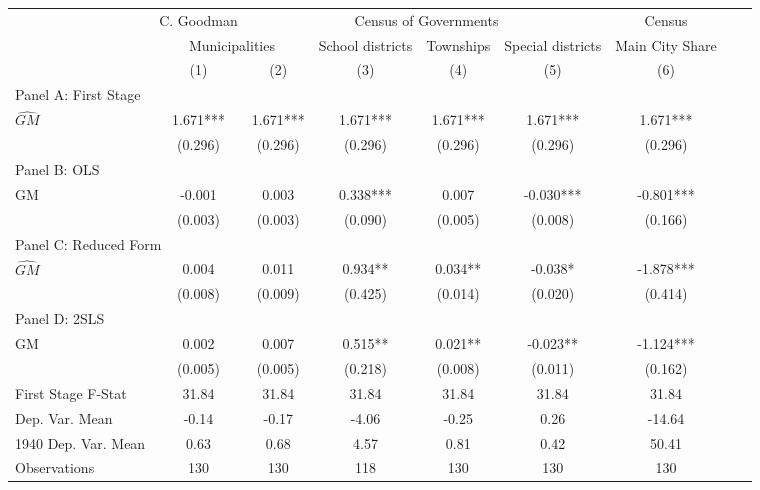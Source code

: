  \begin{tabular}{l*{8}{c}} \toprule
&\multicolumn{1}{c}{C. Goodman}&\multicolumn{4}{c}{Census of Governments}&\multicolumn{1}{c}{Census}\\\cmidrule(lr){2-2}\cmidrule(lr){3-6}\cmidrule(lr){7-7}
&\multicolumn{2}{c}{Municipalities}&\multicolumn{1}{c}{School districts}&\multicolumn{1}{c}{Townships}&\multicolumn{1}{c}{Special districts}&\multicolumn{1}{c}{Main City Share}\\\cmidrule(lr){2-3}\cmidrule(lr){4-6}\cmidrule(lr){7-7}
&\multicolumn{1}{c}{(1)}&\multicolumn{1}{c}{(2)}&\multicolumn{1}{c}{(3)}&\multicolumn{1}{c}{(4)}&\multicolumn{1}{c}{(5)}&\multicolumn{1}{c}{(6)}\\
\cmidrule(lr){1-7}
\multicolumn{6}{l}{Panel A: First Stage}\\
\cmidrule(lr){1-7}
$\widehat{GM}$  &    1.671***&    1.671***&    1.671***&    1.671***&    1.671***&    1.671***\\
                &  (0.296)   &  (0.296)   &  (0.296)   &  (0.296)   &  (0.296)   &  (0.296)   \\
\cmidrule(lr){1-7}
\multicolumn{6}{l}{Panel B: OLS}\\
\cmidrule(lr){1-7}
GM              &   -0.001   &    0.003   &    0.338***&    0.007   &   -0.030***&   -0.801***\\
                &  (0.003)   &  (0.003)   &  (0.090)   &  (0.005)   &  (0.008)   &  (0.166)   \\
\cmidrule(lr){1-7}
\multicolumn{6}{l}{Panel C: Reduced Form}\\
\cmidrule(lr){1-7}
$\widehat{GM}$  &    0.004   &    0.011   &    0.934** &    0.034** &   -0.038*  &   -1.878***\\
                &  (0.008)   &  (0.009)   &  (0.425)   &  (0.014)   &  (0.020)   &  (0.414)   \\
\cmidrule(lr){1-7}
\multicolumn{6}{l}{Panel D: 2SLS}\\
\cmidrule(lr){1-7}
GM              &    0.002   &    0.007   &    0.515** &    0.021** &   -0.023** &   -1.124***\\
                &  (0.005)   &  (0.005)   &  (0.218)   &  (0.008)   &  (0.011)   &  (0.162)   \\
\midrule
First Stage F-Stat&    31.84   &    31.84   &    31.84   &    31.84   &    31.84   &    31.84   \\
Dep. Var. Mean  &    -0.14   &    -0.17   &    -4.06   &    -0.25   &     0.26   &   -14.64   \\
1940 Dep. Var. Mean&     0.63   &     0.68   &     4.57   &     0.81   &     0.42   &    50.41   \\
Observations    &      130   &      130   &      118   &      130   &      130   &      130   \\
 \bottomrule \end{tabular}
